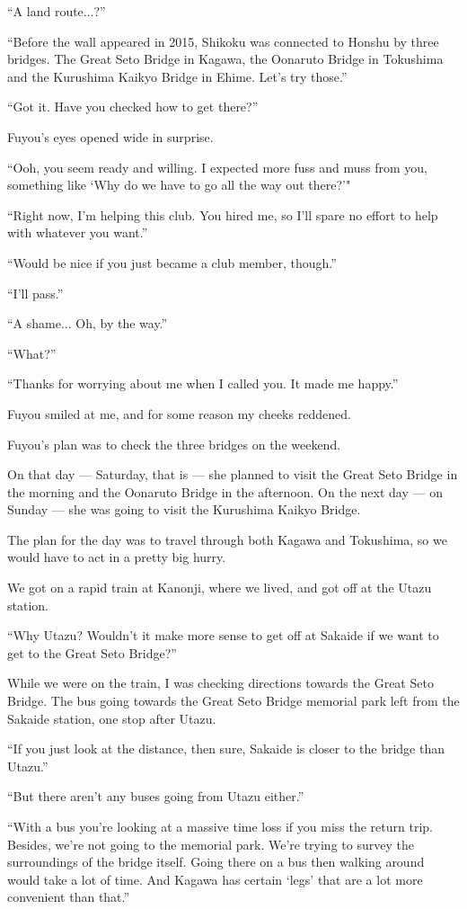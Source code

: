 ``A land route...?''

``Before the wall appeared in 2015, Shikoku was connected to Honshu by three bridges. The Great Seto Bridge in Kagawa, the Oonaruto Bridge in Tokushima and the Kurushima Kaikyo Bridge in Ehime. Let's try those.''

``Got it. Have you checked how to get there?''

Fuyou's eyes opened wide in surprise.

``Ooh, you seem ready and willing. I expected more fuss and muss from you, something like `Why do we have to go all the way out there?'"

``Right now, I'm helping this club. You hired me, so I'll spare no effort to help with whatever you want.''

``Would be nice if you just became a club member, though.''

``I'll pass.''

``A shame... Oh, by the way.''

``What?''

``Thanks for worrying about me when I called you. It made me happy.''

Fuyou smiled at me, and for some reason my cheeks reddened.

Fuyou's plan was to check the three bridges on the weekend.

On that day --- Saturday, that is --- she planned to visit the Great Seto Bridge in the morning and the Oonaruto Bridge in the afternoon. On the next day --- on Sunday --- she was going to visit the Kurushima Kaikyo Bridge.

The plan for the day was to travel through both Kagawa and Tokushima, so we would have to act in a pretty big hurry.

We got on a rapid train at Kanonji, where we lived, and got off at the Utazu station.

``Why Utazu? Wouldn't it make more sense to get off at Sakaide if we want to get to the Great Seto Bridge?''

While we were on the train, I was checking directions towards the Great Seto Bridge. The bus going towards the Great Seto Bridge memorial park left from the Sakaide station, one stop after Utazu.

``If you just look at the distance, then sure, Sakaide is closer to the bridge than Utazu.''

``But there aren't any buses going from Utazu either.''

``With a bus you're looking at a massive time loss if you miss the return trip. Besides, we're not going to the memorial park. We're trying to survey the surroundings of the bridge itself. Going there on a bus then walking around would take a lot of time. And Kagawa has certain `legs' that are a lot more convenient than that.''

